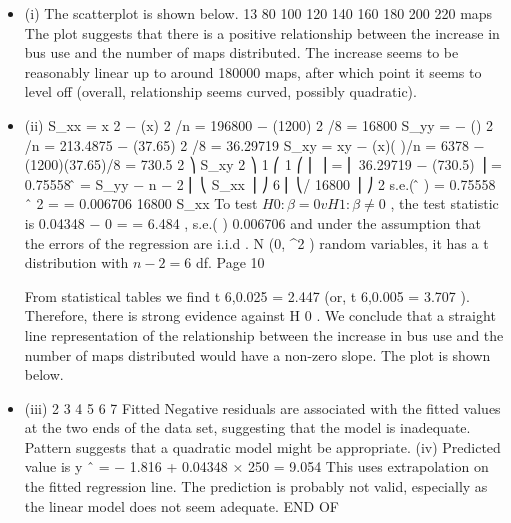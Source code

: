\documentclass[a4paper,12pt]{article}
\begin{document}
\begin{itemize}
\item (i)
The scatterplot is shown below.
13
80
100
120
140
160
180
200
220
maps
The plot suggests that there is a positive relationship between the increase in  bus use and the number of maps distributed. The increase seems to be reasonably linear up to around 180000 maps, after which point it seems to
level off (overall, relationship seems curved, possibly quadratic).
\item (ii)
S_{xx} = \sum x 2 − (\sum x) 2 /n = 196800 − (1200) 2 /8 = 16800
S_{yy} =  − (\sigmay) 2 /n = 213.4875 − (37.65) 2 /8 = 36.29719
S_{xy} = \sum xy − (\sum x)( \sigmay)/n = 6378 − (1200)(37.65)/8 = 730.5
2 ⎞
S_{xy} 2 ⎞ 1 ⎛
1 ⎛ ⎜
⎟ = ⎜ 36.29719 − (730.5) ⎟ = 0.75558
\sigmâ =
S_{yy} −
n − 2 ⎜ ⎝
S_{xx} ⎟ ⎠ 6 ⎜ ⎝/
16800 ⎟ ⎠
2
s.e.( \betâ ) =
0.75558
\sigma ˆ 2
=
= 0.006706
16800
S_{xx}
To test $H 0 : \beta = 0 v H 1 : \beta \neq 0$ , the test statistic is
0.04348
\hat{\beta} − 0
=
= 6.484 ,
s.e.( \hat{\beta} ) 0.006706
and under the assumption that the errors of the regression are i.i.d . N (0, \sigma^2 )
random variables, it has a t distribution with $n - 2 = 6$ df.
Page 10

From statistical tables we find t 6,0.025 = 2.447 (or, t 6,0.005 = 3.707 ).
Therefore, there is strong evidence against H 0 . We conclude that a straight line representation of the relationship between the increase in bus use and the number of maps distributed would have a non-zero slope.
The plot is shown below.
\item (iii)
2
3
4
5
6
7
Fitted
Negative residuals are associated with the fitted values at the two ends of the
data set, suggesting that the model is inadequate. Pattern suggests that a
quadratic model might be appropriate.
(iv)
Predicted value is y ˆ = − 1.816 + 0.04348 × 250 = 9.054
This uses extrapolation on the fitted regression line. The prediction is probably not valid, especially as the linear model does not seem adequate.
END OF %
\end{itemize}
\end{document}
